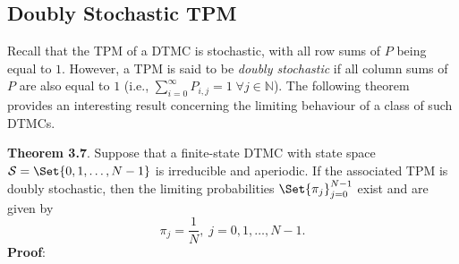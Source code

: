 \subsection*{Doubly Stochastic TPM}
Recall that the TPM of a DTMC is stochastic, with all row sums of $P$ being equal to $1$.
However, a TPM is said to be \emph{doubly stochastic} if all column sums of $P$ are also equal to $1$
(i.e., $ \sum_{i=0}^{\infty} P_{i,j}=1\;\forall j\in\mathbb{N} $). The following theorem provides an interesting result concerning
the limiting behaviour of a class of such DTMCs.
\begin{Result}
    \textbf{Theorem 3.7}. Suppose that a finite-state DTMC with state space $ \mathcal{S}=\Set{0,1,\ldots,N-1} $ is
    irreducible and aperiodic. If the associated TPM is doubly stochastic, then the limiting
    probabilities $ \Set{\pi_j}_{j=0}^{N-1} $ exist and are given by
    \[ \pi_j=\frac{1}{N} ,\; j=0,1,\ldots,N-1. \]
    \tcblower{}
    \textbf{Proof}:
\end{Result}
